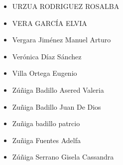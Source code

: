 \begin{spacing}{0.5}
\begin{paracol}{2}
\begin{itemize}
\item URZUA RODRIGUEZ ROSALBA
\item VERA GARCÍA ELVIA
\item Vergara Jiménez Manuel Arturo
\item Verónica Díaz Sánchez
\item Villa Ortega Eugenio
\item Zúñiga Badillo Asered Valeria
\item Zuñiga Badillo Juan De Dios
\item Zuñiga badillo patrcio
\item Zuñiga Fuentes Adelfa
\item Zúñiga Serrano Gisela Cassandra
\end{itemize}
\end{paracol}
\end{spacing}


